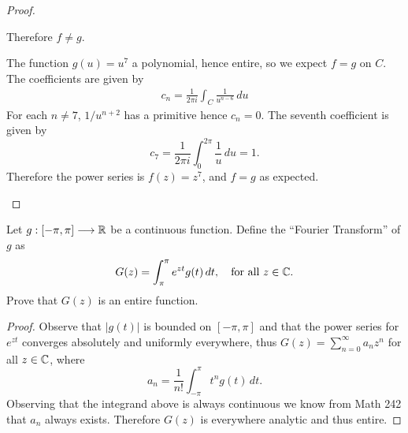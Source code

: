 \documentclass[10pt]{amsart}
\begin{document}
\begin{thm}
\begin{proof}
\begin{alphaenum}
      Therefore $f \not = g$.
    \item
      The function $g(u) = u^7$ a polynomial, hence entire, so we expect $f = g$ on $C$.
      The coefficients are given by
      \begin{align*}
        c_n = \frac{1}{2\pi i}\int_C \frac{1}{u^{n-6}}\,du
      \end{align*}
      For each $n \not = 7$, $1/u^{n+2}$ has a primitive hence $c_n = 0$.
      The seventh coefficient is given by $$c_7 = \frac{1}{2\pi i}\int_0^{2\pi}\frac{1}{u}\,du = 1.$$ 
      Therefore the power series is $f(z) = z^7$, and $f = g$ as expected.
    \end{alphaenum}
  \end{proof}
\end{thm}
  
\begin{thm}
  \label{Ex3}
  Let $g:[-\pi,\pi] \longrightarrow \mathbb{R}$ be a continuous function.
  Define the ``Fourier Transform'' of $g$ as $$G(z) = \int_{\pi}^{\pi} e^{zt}g(t)\,dt, \quad \text{for all } z \in \mathbb{C}.$$
  Prove that $G(z)$ is an entire function.
  
  \begin{proof}
    Observe that $|g(t) |$ is bounded on $[-\pi,\pi]$ and that the power series for $e^{zt}$ converges absolutely and uniformly everywhere, thus
    $G(z) = \sum_{n=0}^{\infty}a_nz^n$ for all $z \in \mathbb{C}$, where $$a_n = \frac{1}{n!}\int_{-\pi}^{\pi}t^ng(t)\,dt.$$
    Observing that the integrand above is always continuous we know from Math 242 that $a_n$ always exists.
    Therefore $G(z)$ is everywhere analytic and thus entire.
  \end{proof}
\end{thm}
\end{document}

